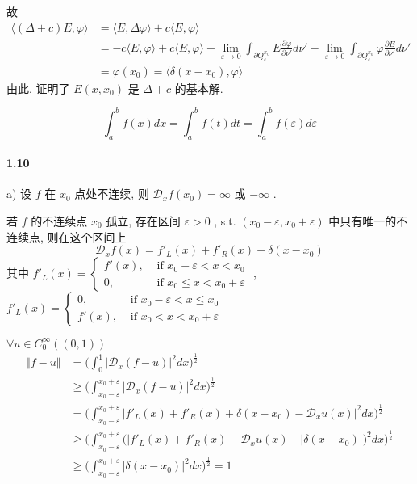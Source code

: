 \documentclass[a4paper, UTF8]{ctexart}				%
\begin{document}
        故 
        \[
            \begin{split}
                \langle{(\Delta + c)E},{\varphi}\rangle
                & = \langle{E},{\Delta \varphi}\rangle + c \langle{E},{\varphi}\rangle\\
                & = -c \langle{E},{\varphi}\rangle + c \langle{E},{\varphi}\rangle + \lim_{\varepsilon \rightarrow 0} \int^{}_{\partial Q^{x_0}_\varepsilon} E \frac{\partial \varphi}{\partial \nu'}d\nu' - \lim_{\varepsilon \rightarrow 0} \int^{}_{\partial Q^{x_0}_\varepsilon} \varphi \frac{\partial E}{\partial \nu'}d\nu'\\
                & = \varphi(x_0) = \langle{\delta(x-x_0)},{\varphi}\rangle
            \end{split}
        \]
        由此, 证明了 $E(x,x_0)$ 是 $\Delta + c$ 的基本解.
        
        \[
            \int^{b}_{a} f(x) dx = \int^{b}_{a} f(t) dt = \int^{b}_{a} f(\varepsilon) d\varepsilon
        \]
    \paragraph{1.10}\quad 
        a) 设 $f$ 在 $x_0$ 点处不连续, 则 $\mathcal{D}_x f(x_0) = \infty$ 或 $-\infty$ .
        
        若 $f$ 的不连续点 $x_0$ 孤立, 存在区间 $\varepsilon > 0$ , s.t. $(x_0-\varepsilon, x_0 + \varepsilon)$ 中只有唯一的不连续点, 则在这个区间上
        $$\mathcal{D}_x f(x) = f'_L(x) + f'_R(x) + \delta(x-x_0)$$
        其中
        $f'_L(x) = \begin{cases}f'(x), &\text{ if }x_0 - \varepsilon < x < x_0\\0, &\text{ if }x_0 \le x < x_0 + \varepsilon\end{cases}$ , 
        $f'_L(x) = \begin{cases}0, &\text{ if }x_0 - \varepsilon < x \le x_0\\f'(x), &\text{ if }x_0 < x < x_0 + \varepsilon\end{cases}$
        
        $\forall u \in C^{\infty}_0((0,1))$
        \[
            \begin{split}
                \Vert{f-u}\Vert
                & = \biggl(\int^{1}_{0} \vert{\mathcal{D}_x (f-u)}\vert^2 dx \biggl)^{\frac{1}{2}}\\
                & \ge \biggl(\int^{x_0+\varepsilon}_{x_0-\varepsilon} \vert{\mathcal{D}_x (f-u)}\vert^2 dx \biggl)^{\frac{1}{2}}\\
                & = \biggl(\int^{x_0+\varepsilon}_{x_0-\varepsilon} \vert{f'_L(x) + f'_R(x) + \delta(x-x_0) - \mathcal{D}_x u(x)}\vert^2 dx \biggl)^{\frac{1}{2}}\\
                & \ge \biggl(\int^{x_0+\varepsilon}_{x_0-\varepsilon} \big(\vert{f'_L(x) + f'_R(x) - \mathcal{D}_x u(x)}\vert - \vert{\delta(x-x_0)}\vert\big)^2 dx \biggl)^{\frac{1}{2}}\\
                & \ge \biggl(\int^{x_0+\varepsilon}_{x_0-\varepsilon} \vert{\delta(x-x_0)}\vert^2 dx \biggl)^{\frac{1}{2}} = 1
            \end{split}
        \]
\end{document}
